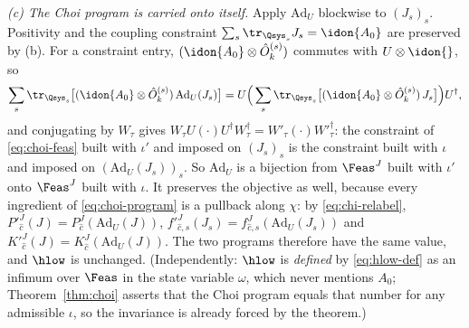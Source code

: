 \begin{remark}
\emph{(c) The Choi program is carried onto itself.} Apply
$\mathrm{Ad}_{U}$ blockwise to $(J_s)_{s}$. Positivity and the coupling
constraint $\sum_s\tr_{\Qsys_s}J_s=\idon{A_0}$ are preserved by (b). For a
constraint entry, $(\idon{A_0}\otimes\hat O^{(s)}_k)$ commutes with
$U\otimes\idon{}$, so
\begin{equation*}
  \sum_s\tr_{\Qsys_s}\big[(\idon{A_0}\otimes\hat O^{(s)}_k)\,
  \mathrm{Ad}_{U}(J_s)\big]
  =U\Big(\sum_s\tr_{\Qsys_s}\big[(\idon{A_0}\otimes\hat O^{(s)}_k)\,
  J_s\big]\Big)U^{\dagger},
\end{equation*}
and conjugating by $W_{\tau}$ gives
$W_{\tau}U(\cdot)U^{\dagger}W^{\dagger}_{\tau}
=W'_{\tau}(\cdot)W'^{\dagger}_{\tau}$: the constraint of
\eqref{eq:choi-feas} built with $\iota'$ and imposed on $(J_s)_s$ is the
constraint built with $\iota$ and imposed on
$(\mathrm{Ad}_{U}(J_s))_s$. So $\mathrm{Ad}_{U}$ is a bijection from
$\Feas^{J}$ built with $\iota'$ onto $\Feas^{J}$ built with $\iota$. It
preserves the objective as well, because every ingredient of
\eqref{eq:choi-program} is a pullback along $\chi$: by
\eqref{eq:chi-relabel},
$P'^{J}_{\hat c}(J)=P^{J}_{\hat c}(\mathrm{Ad}_{U}(J))$,
$f'^{J}_{\hat c,s}(J_s)=f^{J}_{\hat c,s}(\mathrm{Ad}_{U}(J_s))$ and
$K'^{J}_{\hat c}(J)=K^{J}_{\hat c}(\mathrm{Ad}_{U}(J))$. The two programs
therefore have the same value, and $\hlow$ is unchanged. (Independently:
$\hlow$ is \emph{defined} by \eqref{eq:hlow-def} as an infimum over
$\Feas$ in the state variable $\omega$, which never mentions $A_0$;
Theorem~\ref{thm:choi} asserts that the Choi program equals that number
for any admissible $\iota$, so the invariance is already forced by the
theorem.)


\end{remark}
